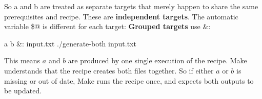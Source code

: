\documentclass{report}
\begin{document}
\begin{itemize}
            \bigbreak \noindent 
            So a and b are treated as separate targets that merely happen to share the same prerequisites and recipe. These are \textbf{independent targets}. The automatic variable \$@ is different for each target:
            \bigbreak \noindent 
            \textbf{Grouped targets} use \&:
            \bigbreak \noindent 
            \begin{bashcode}
                a b &: input.txt
                    ./generate-both input.txt
            \end{bashcode}
            \bigbreak \noindent 
            This means $a$ and $b$ are produced by one single execution of the recipe.
            \bigbreak \noindent 
            Make understands that the recipe creates both files together.
            \bigbreak \noindent 
            So if either $a$ or $b$ is missing or out of date, Make runs the recipe once, and expects both outputs to be updated.

    \end{itemize}
\end{document}
